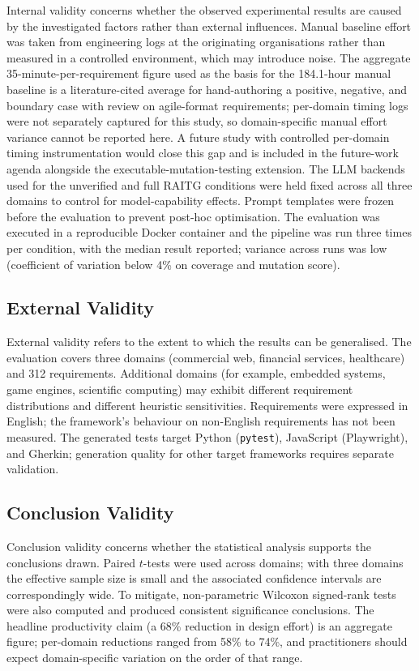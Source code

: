 \documentclass[conference]{IEEEtran}
\begin{document}
Internal validity concerns whether the observed experimental results are caused by the investigated factors rather than external influences. Manual baseline effort was taken from engineering logs at the originating organisations rather than measured in a controlled environment, which may introduce noise. The aggregate 35-minute-per-requirement figure used as the basis for the 184.1-hour manual baseline is a literature-cited average for hand-authoring a positive, negative, and boundary case with review on agile-format requirements; per-domain timing logs were not separately captured for this study, so domain-specific manual effort variance cannot be reported here. A future study with controlled per-domain timing instrumentation would close this gap and is included in the future-work agenda alongside the executable-mutation-testing extension. The LLM backends used for the unverified and full RAITG conditions were held fixed across all three domains to control for model-capability effects. Prompt templates were frozen before the evaluation to prevent post-hoc optimisation. The evaluation was executed in a reproducible Docker container and the pipeline was run three times per condition, with the median result reported; variance across runs was low (coefficient of variation below 4\% on coverage and mutation score).

\subsection{External Validity}

External validity refers to the extent to which the results can be generalised. The evaluation covers three domains (commercial web, financial services, healthcare) and 312 requirements. Additional domains (for example, embedded systems, game engines, scientific computing) may exhibit different requirement distributions and different heuristic sensitivities. Requirements were expressed in English; the framework's behaviour on non-English requirements has not been measured. The generated tests target Python (\texttt{pytest}), JavaScript (Playwright), and Gherkin; generation quality for other target frameworks requires separate validation.

\subsection{Conclusion Validity}

Conclusion validity concerns whether the statistical analysis supports the conclusions drawn. Paired $t$-tests were used across domains; with three domains the effective sample size is small and the associated confidence intervals are correspondingly wide. To mitigate, non-parametric Wilcoxon signed-rank tests were also computed and produced consistent significance conclusions. The headline productivity claim (a 68\% reduction in design effort) is an aggregate figure; per-domain reductions ranged from 58\% to 74\%, and practitioners should expect domain-specific variation on the order of that range.
\end{document}
